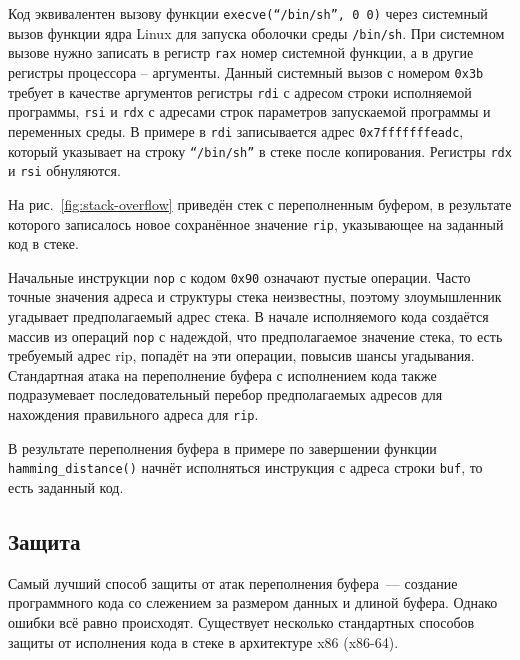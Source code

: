 Код эквивалентен вызову функции \texttt{execve(``/bin/sh'', 0 0)} через системный вызов функции ядра Linux для запуска оболочки среды \texttt{/bin/sh}. При системном вызове нужно записать в регистр \texttt{rax} номер системной функции, а в другие регистры процессора -- аргументы. Данный системный вызов с номером \texttt{0x3b} требует в качестве аргументов регистры \texttt{rdi} с адресом строки исполняемой программы, \texttt{rsi} и \texttt{rdx} с адресами строк параметров запускаемой программы и переменных среды. В примере в \texttt{rdi} записывается адрес \texttt{0x7fffffffeadc}, который указывает на строку \texttt{``/bin/sh''} в стеке после копирования. Регистры \texttt{rdx} и \texttt{rsi} обнуляются.

На рис.~\ref{fig:stack-overflow} приведён стек с переполненным буфером, в результате которого записалось новое сохранённое значение \texttt{rip}, указывающее на заданный код в стеке.

Начальные инструкции \texttt{nop} с кодом \texttt{0x90} означают пустые операции. Часто точные значения адреса и структуры стека неизвестны, поэтому злоумышленник угадывает предполагаемый адрес стека. В начале исполняемого кода создаётся массив из операций \texttt{nop} с надеждой, что предполагаемое значение стека, то есть требуемый адрес rip, попадёт на эти операции, повысив шансы угадывания. Стандартная атака на переполнение буфера с исполнением кода также подразумевает последовательный перебор предполагаемых адресов для нахождения правильного адреса для \texttt{rip}.

В результате переполнения буфера в примере по завершении функции \texttt{hamming\_distance()} начнёт исполняться инструкция с адреса строки \texttt{buf}, то есть заданный код.


\subsection{Защита}

Самый лучший способ защиты от атак переполнения буфера~--- создание программного кода со слежением за размером данных и длиной буфера. Однако ошибки всё равно происходят. Существует несколько стандартных способов защиты от исполнения кода в стеке в архитектуре x86 (x86-64).

